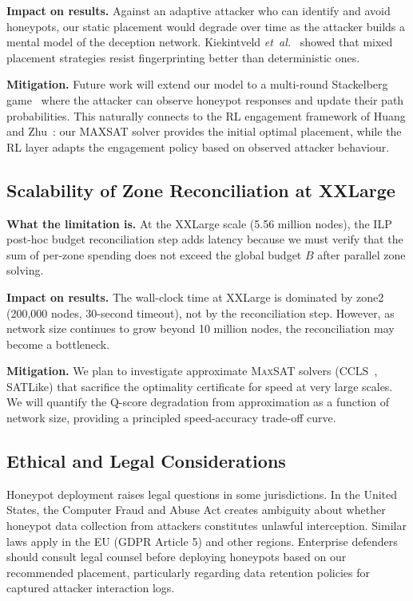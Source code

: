 \documentclass[journal]{IEEEtran}
\newcommand{\etal}{\emph{et~al.}}
\newcommand{\maxsat}{\textsc{MaxSAT}}
\begin{document}
\textbf{Impact on results.}
Against an adaptive attacker who can identify and avoid
honeypots, our static placement would degrade over time as
the attacker builds a mental model of the deception
network.
Kiekintveld \etal{}~\cite{kiekintveld2015} showed that
mixed placement strategies resist fingerprinting better
than deterministic ones.

\textbf{Mitigation.}
Future work will extend our model to a multi-round
Stackelberg game~\cite{kiekintveld2015} where the attacker
can observe honeypot responses and update their path
probabilities.
This naturally connects to the RL engagement framework
of Huang and Zhu~\cite{huang2019}: our MAXSAT solver
provides the initial optimal placement, while the RL layer
adapts the engagement policy based on observed attacker
behaviour.

\subsection{Scalability of Zone Reconciliation at XXLarge}

\textbf{What the limitation is.}
At the XXLarge scale (5.56 million nodes), the ILP
post-hoc budget reconciliation step adds latency because
we must verify that the sum of per-zone spending does not
exceed the global budget $B$ after parallel zone solving.

\textbf{Impact on results.}
The wall-clock time at XXLarge is dominated by zone2
(200,000 nodes, 30-second timeout), not by the
reconciliation step.
However, as network size continues to grow beyond
10 million nodes, the reconciliation may become a
bottleneck.

\textbf{Mitigation.}
We plan to investigate approximate \maxsat{} solvers
(CCLS~\cite{narodytska2014}, SATLike) that sacrifice the
optimality certificate for speed at very large scales.
We will quantify the Q-score degradation from approximation
as a function of network size, providing a principled
speed-accuracy trade-off curve.

\subsection{Ethical and Legal Considerations}

Honeypot deployment raises legal questions in some
jurisdictions.
In the United States, the Computer Fraud and Abuse Act
creates ambiguity about whether honeypot data collection
from attackers constitutes unlawful interception.
Similar laws apply in the EU (GDPR Article 5) and other
regions.
Enterprise defenders should consult legal counsel before
deploying honeypots based on our recommended placement,
particularly regarding data retention policies for
captured attacker interaction logs.
\end{document}
